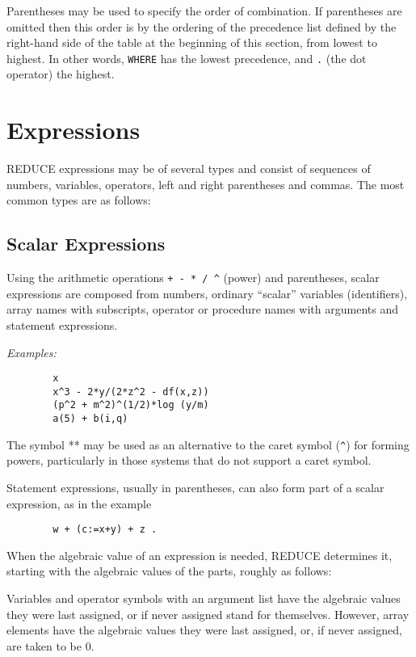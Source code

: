 \documentclass[11pt,letterpaper]{book}
\newcommand{\REDUCE}{REDUCE}
\begin{document}
Parentheses may be used to specify the order of combination.  If
parentheses are omitted then this order is by the ordering of the
precedence list defined by the right-hand side
of the {\tt <infix operator>} table
at the beginning of this section,
from lowest to highest.  In other words, {\tt WHERE} has the lowest
precedence, and {\tt .} (the dot operator) the highest.

\chapter{Expressions}

{\REDUCE} expressions may be of several types and consist
of sequences of numbers, variables, operators, left and right parentheses
and commas.  The most common types are as follows:

\section{Scalar Expressions}

Using the arithmetic operations {\tt + - * / \verb|^|}
(power) and parentheses, scalar expressions are composed from numbers,
ordinary ``scalar'' variables (identifiers), array names with subscripts,
operator or procedure names with arguments and statement expressions.

{\it Examples:}
{\small\begin{verbatim}
        x
        x^3 - 2*y/(2*z^2 - df(x,z))
        (p^2 + m^2)^(1/2)*log (y/m)
        a(5) + b(i,q)
\end{verbatim}}
The symbol ** may be used as an alternative to the caret symbol (\verb+^+)
for forming powers, particularly in those systems that do not support a
caret symbol.

Statement expressions, usually in parentheses, can also form part of
a scalar expression, as in the example
{\small\begin{verbatim}
        w + (c:=x+y) + z .
\end{verbatim}}
When the algebraic value of an expression is needed, {\REDUCE} determines it,
starting with the algebraic values of the parts, roughly as follows:

Variables and operator symbols with an argument list have the algebraic
values they were last assigned, or if never assigned stand for themselves.
However, array elements have the algebraic values they were last assigned,
or, if never assigned, are taken to be 0.
\end{document}
